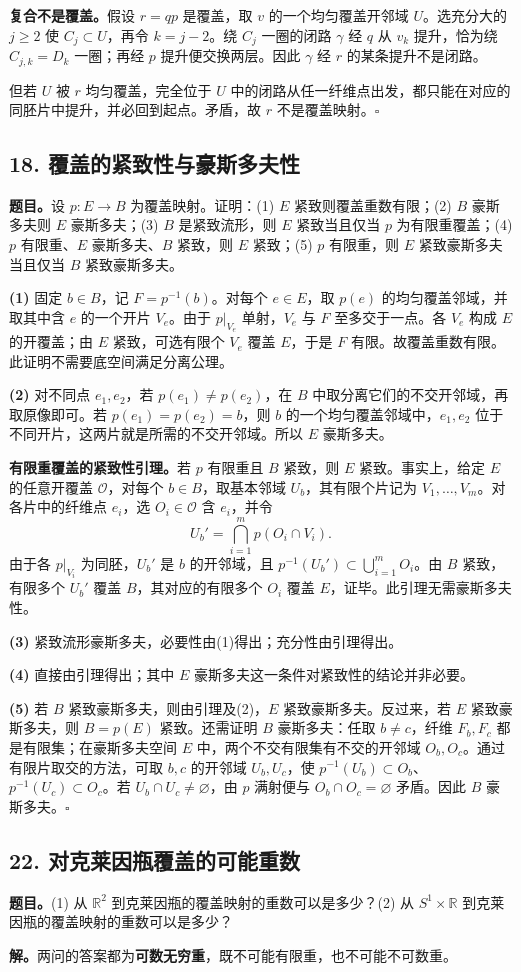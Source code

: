 \documentclass[UTF8,11pt,a4paper]{ctexart}
\newcommand{\R}{\mathbb R}\newcommand{\Z}{\mathbb Z}\newcommand{\C}{\mathbb C}
\newcommand{\problem}[2]{\subsection*{#1}\noindent\textbf{题目。}#2\par}
\begin{document}
\textbf{复合不是覆盖。}假设 $r=qp$ 是覆盖，取 $v$ 的一个均匀覆盖开邻域 $U$。选充分大的 $j\ge2$ 使 $C_j\subset U$，再令 $k=j-2$。绕 $C_j$ 一圈的闭路 $\gamma$ 经 $q$ 从 $v_k$ 提升，恰为绕 $C_{j,k}=D_k$ 一圈；再经 $p$ 提升便交换两层。因此 $\gamma$ 经 $r$ 的某条提升不是闭路。

但若 $U$ 被 $r$ 均匀覆盖，完全位于 $U$ 中的闭路从任一纤维点出发，都只能在对应的同胚片中提升，并必回到起点。矛盾，故 $r$ 不是覆盖映射。\hfill$\square$
\newpage
\problem{18. 覆盖的紧致性与豪斯多夫性}{设 $p:E\to B$ 为覆盖映射。证明：(1) $E$ 紧致则覆盖重数有限；(2) $B$ 豪斯多夫则 $E$ 豪斯多夫；(3) $B$ 是紧致流形，则 $E$ 紧致当且仅当 $p$ 为有限重覆盖；(4) $p$ 有限重、$E$ 豪斯多夫、$B$ 紧致，则 $E$ 紧致；(5) $p$ 有限重，则 $E$ 紧致豪斯多夫当且仅当 $B$ 紧致豪斯多夫。}
\pf\textbf{(1)} 固定 $b\in B$，记 $F=p^{-1}(b)$。对每个 $e\in E$，取 $p(e)$ 的均匀覆盖邻域，并取其中含 $e$ 的一个开片 $V_e$。由于 $p|_{V_e}$ 单射，$V_e$ 与 $F$ 至多交于一点。各 $V_e$ 构成 $E$ 的开覆盖；由 $E$ 紧致，可选有限个 $V_e$ 覆盖 $E$，于是 $F$ 有限。故覆盖重数有限。此证明不需要底空间满足分离公理。

\textbf{(2)} 对不同点 $e_1,e_2$，若 $p(e_1)\ne p(e_2)$，在 $B$ 中取分离它们的不交开邻域，再取原像即可。若 $p(e_1)=p(e_2)=b$，则 $b$ 的一个均匀覆盖邻域中，$e_1,e_2$ 位于不同开片，这两片就是所需的不交开邻域。所以 $E$ 豪斯多夫。

\textbf{有限重覆盖的紧致性引理。}若 $p$ 有限重且 $B$ 紧致，则 $E$ 紧致。事实上，给定 $E$ 的任意开覆盖 $\mathcal O$，对每个 $b\in B$，取基本邻域 $U_b$，其有限个片记为 $V_1,\ldots,V_m$。对各片中的纤维点 $e_i$，选 $O_i\in\mathcal O$ 含 $e_i$，并令
\[U_b'=\bigcap_{i=1}^m p(O_i\cap V_i).\]
由于各 $p|_{V_i}$ 为同胚，$U_b'$ 是 $b$ 的开邻域，且 $p^{-1}(U_b')\subset\bigcup_{i=1}^m O_i$。由 $B$ 紧致，有限多个 $U_b'$ 覆盖 $B$，其对应的有限多个 $O_i$ 覆盖 $E$，证毕。此引理无需豪斯多夫性。

\textbf{(3)} 紧致流形豪斯多夫，必要性由(1)得出；充分性由引理得出。

\textbf{(4)} 直接由引理得出；其中 $E$ 豪斯多夫这一条件对紧致性的结论并非必要。

\textbf{(5)} 若 $B$ 紧致豪斯多夫，则由引理及(2)，$E$ 紧致豪斯多夫。反过来，若 $E$ 紧致豪斯多夫，则 $B=p(E)$ 紧致。还需证明 $B$ 豪斯多夫：任取 $b\ne c$，纤维 $F_b,F_c$ 都是有限集；在豪斯多夫空间 $E$ 中，两个不交有限集有不交的开邻域 $O_b,O_c$。通过有限片取交的方法，可取 $b,c$ 的开邻域 $U_b,U_c$，使 $p^{-1}(U_b)\subset O_b$、$p^{-1}(U_c)\subset O_c$。若 $U_b\cap U_c\ne\varnothing$，由 $p$ 满射便与 $O_b\cap O_c=\varnothing$ 矛盾。因此 $B$ 豪斯多夫。\hfill$\square$
\newpage
\problem{22. 对克莱因瓶覆盖的可能重数}{(1) 从 $\R^2$ 到克莱因瓶的覆盖映射的重数可以是多少？(2) 从 $S^1\times\R$ 到克莱因瓶的覆盖映射的重数可以是多少？}
\textbf{解。}两问的答案都为\textbf{可数无穷重}，既不可能有限重，也不可能不可数重。
\end{document}

